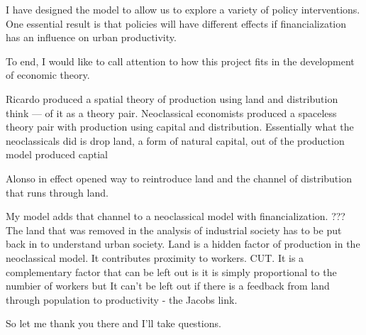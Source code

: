 \documentclass[]{article}
\begin{document}
I have designed the model to allow us to explore a variety of policy interventions. One essential result is that policies will have different effects if financialization has an influence on urban productivity.

To end, I would like to call attention to how this project fits in the development of economic theory.

Ricardo produced a spatial theory of production using land and distribution think — of it as a theory pair.
Neoclassical economists produced a spaceless theory pair with production using capital and distribution.
Essentially what the neoclassicals did is drop land, a form of natural capital, out of the production model produced captial

Alonso in effect opened way to reintroduce land and the channel of distribution that runs through land.

My model adds that channel to a neoclassical model with financialization.
??? The land that was removed in the analysis of industrial society has to be put back in to understand urban society. Land is a hidden factor of production in the neoclassical model. It contributes proximity to workers. CUT. It is a complementary factor that can be left out is it is simply proportional to the numbier of workers but It can’t be left out if there is a feedback from land through population to productivity - the Jacobs link.

So let me thank you there and I’ll take questions.
\end{document}
